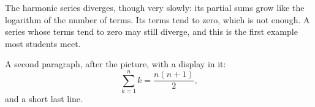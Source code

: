 \documentclass{article}
\begin{document}
The harmonic series diverges, though very slowly: its partial sums grow like
the logarithm of the number of terms. Its terms tend to zero, which is not
enough. A series whose terms tend to zero may still diverge, and this is the
first example most students meet.

\begin{center}
\end{center}
A second paragraph, after the picture, with a display in it:
\[
  \sum_{k=1}^{n} k = \frac{n(n+1)}{2},
\]
and a short last line.
\end{document}
